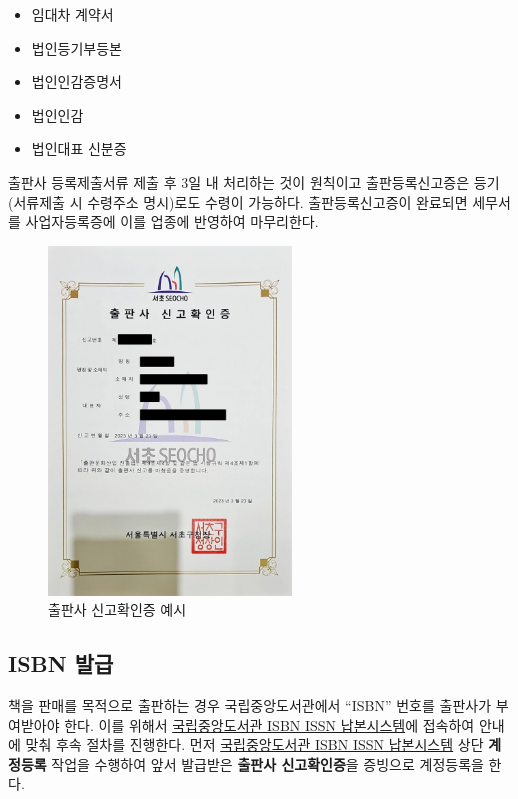 \documentclass[
  letterpaper,
]{book}
\providecommand{\tightlist}{%
  \setlength{\itemsep}{0pt}\setlength{\parskip}{0pt}}\usepackage{longtable,booktabs,array}
\begin{document}
\begin{itemize}
\tightlist
\item
  임대차 계약서
\item
  법인등기부등본
\item
  법인인감증명서
\item
  법인인감
\item
  법인대표 신분증
\end{itemize}

출판사 등록제출서류 제출 후 3일 내 처리하는 것이 원칙이고
출판등록신고증은 등기(서류제출 시 수령주소 명시)로도 수령이 가능하다.
출판등록신고증이 완료되면 세무서를 사업자등록증에 이를 업종에 반영하여
마무리한다.

\begin{figure}

{\centering \includegraphics[width=2.54167in,height=\textheight]{images/publishing_license.jpg}

}

\caption{출판사 신고확인증 예시}

\end{figure}

\hypertarget{isbn-uxbc1cuxae09}{%
\subsection{ISBN 발급}\label{isbn-uxbc1cuxae09}}

책을 판매를 목적으로 출판하는 경우 국립중앙도서관에서 ``ISBN'' 번호를
출판사가 부여받아야 한다. 이를 위해서
\href{https://www.nl.go.kr/seoji/}{국립중앙도서관 ISBN ISSN
납본시스템}에 접속하여 안내에 맞춰 후속 절차를 진행한다. 먼저
\href{https://www.nl.go.kr/seoji/}{국립중앙도서관 ISBN ISSN 납본시스템}
상단 \textbf{계정등록} 작업을 수행하여 앞서 발급받은 \textbf{출판사
신고확인증}을 증빙으로 계정등록을 한다.
\end{document}

